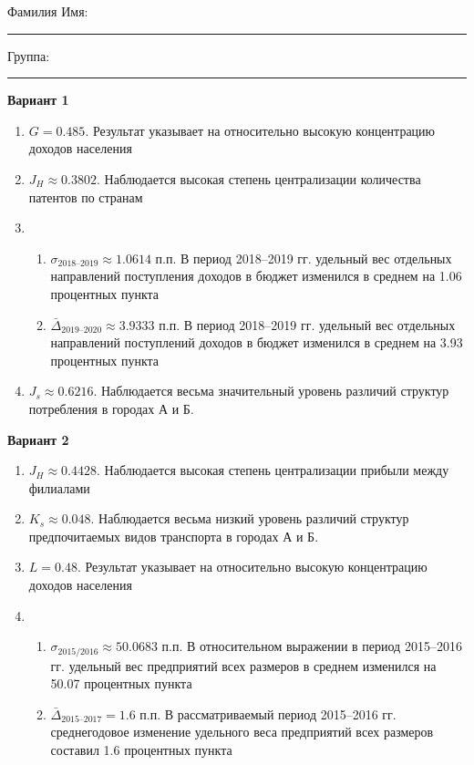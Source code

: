 \documentclass{article}
\begin{document}
\mbox{}

\vspace{-36pt}

\begin{center}
	\begin{tcolorbox}[colback=white, boxrule=0.20ex, sharp corners = all, height=25pt, colframe=black, valign=top]
		\begin{center}
			Фамилия Имя:\hspace{1.5pt}\rule{190pt}{0pt}\hspace{50pt}Группа:\hspace{1.5pt}\rule{60pt}{0pt}
		\end{center}
	\end{tcolorbox}
\end{center}
\vspace{3pt}

\twocolumn\textbf{Вариант 1}
\begin{enumerate}
\item $G= 0.485$. Результат указывает на относительно высокую концентрацию доходов населения
\item $J_H \approx 0.3802$. Наблюдается высокая степень централизации количества патентов по странам
\item \begin{enumerate} \item $\sigma_\text{2018--2019}\approx 1.0614$ п.п. В период 2018--2019 гг. удельный вес отдельных направлений поступления доходов в бюджет изменился в среднем на 1.06 процентных пункта
\item $\bar\Delta_\text{2019--2020}\approx 3.9333$ п.п. В период 2018--2019 гг. удельный вес отдельных направлений поступлений доходов в бюджет изменился в среднем на 3.93 процентных пункта\end{enumerate}
\item $J_s\approx 0.6216$. Наблюдается весьма значительный уровень различий структур потребления в городах А и Б.
\end{enumerate}

\textbf{Вариант 2}
\begin{enumerate}
\item $J_H \approx 0.4428$. Наблюдается высокая степень централизации прибыли между филиалами
\item $K_s\approx 0.048$. Наблюдается весьма низкий уровень различий структур предпочитаемых видов транспорта в городах А и Б.
\item $L= 0.48$. Результат указывает на относительно высокую концентрацию доходов населения
\item \begin{enumerate} \item $\sigma_\text{2015/2016}\approx 50.0683$ п.п. В относительном выражении в период 2015--2016 гг. удельный вес предприятий всех размеров в среднем изменился на 50.07 процентных пункта
\item $\bar\Delta_\text{2015--2017}= 1.6$ п.п. В рассматриваемый период 2015--2016 гг. среднегодовое изменение удельного веса предприятий всех размеров составил 1.6 процентных пункта\end{enumerate}
\end{enumerate}
\end{document}

